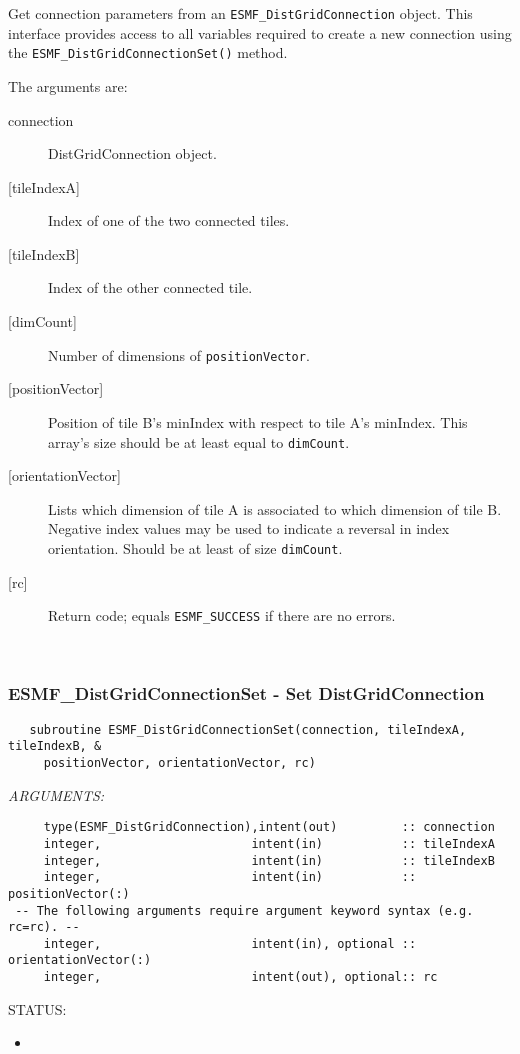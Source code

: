      \label{api:DistGridConnectionGet}
     Get connection parameters from an {\tt ESMF\_DistGridConnection} object.
     This interface provides access to all variables required to create a new
     connection using the {\tt ESMF\_DistGridConnectionSet()} method.
  
     The arguments are:
     \begin{description}
     \item[connection]
       DistGridConnection object.
     \item[{[tileIndexA]}]
       Index of one of the two connected tiles.
     \item[{[tileIndexB]}]
       Index of the other connected tile.
     \item[{[dimCount]}]
       Number of dimensions of {\tt positionVector}.
     \item[{[positionVector]}]
       Position of tile B's minIndex with respect to tile A's minIndex.
       This array's size should be at least equal to {\tt dimCount}.
     \item[{[orientationVector]}]
       Lists which dimension of tile A is associated to which dimension of
       tile B. Negative index values may be used to indicate a reversal
       in index orientation. Should be at least of size {\tt dimCount}.
     \item[{[rc]}]
       Return code; equals {\tt ESMF\_SUCCESS} if there are no errors.
     \end{description}
   
 
\mbox{}\hrulefill\ 
 
\subsubsection [ESMF\_DistGridConnectionSet] {ESMF\_DistGridConnectionSet - Set DistGridConnection}


\begin{verbatim}   subroutine ESMF_DistGridConnectionSet(connection, tileIndexA, tileIndexB, &
     positionVector, orientationVector, rc)\end{verbatim}{\em ARGUMENTS:}
\begin{verbatim}     type(ESMF_DistGridConnection),intent(out)         :: connection
     integer,                     intent(in)           :: tileIndexA
     integer,                     intent(in)           :: tileIndexB
     integer,                     intent(in)           :: positionVector(:)
 -- The following arguments require argument keyword syntax (e.g. rc=rc). --
     integer,                     intent(in), optional :: orientationVector(:)
     integer,                     intent(out), optional:: rc
           \end{verbatim}
{\sf STATUS:}
   \begin{itemize}
   \item{}
   \end{itemize}
  
